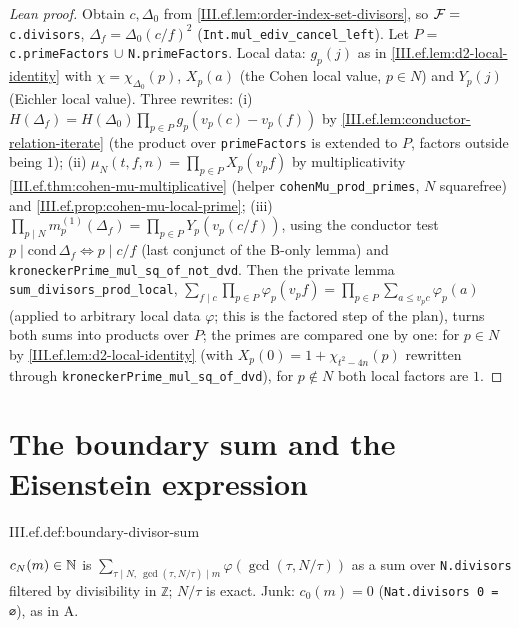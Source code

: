 \begin{proof}[Lean proof]
Obtain $c,\Delta_0$ from \cref{III.ef.lem:order-index-set-divisors}, so $\mathcal{F}=$ \texttt{c.divisors}, $\Delta_f=\Delta_0(c/f)^2$ (\texttt{Int.mul\_ediv\_cancel\_left}). Let $P=$ \texttt{c.primeFactors} $\cup$ \texttt{N.primeFactors}. Local data: $g_p(j)$ as in \cref{III.ef.lem:d2-local-identity} with $\chi=\chi_{\Delta_0}(p)$, $X_p(a)$ (the Cohen local value, $p\in N$) and $Y_p(j)$ (Eichler local value). Three rewrites: (i) $H(\Delta_f)=H(\Delta_0)\prod_{p\in P}g_p(v_p(c)-v_p(f))$ by \cref{III.ef.lem:conductor-relation-iterate} (the product over \texttt{primeFactors} is extended to $P$, factors outside being $1$); (ii) $\mu_N(t,f,n)=\prod_{p\in P}X_p(v_p f)$ by multiplicativity \cref{III.ef.thm:cohen-mu-multiplicative} (helper \texttt{cohenMu\_prod\_primes}, $N$ squarefree) and \cref{III.ef.prop:cohen-mu-local-prime}; (iii) $\prod_{p\mid N}m^{(1)}_p(\Delta_f)=\prod_{p\in P}Y_p(v_p(c/f))$, using the conductor test $p\mid\mathrm{cond}\,\Delta_f\iff p\mid c/f$ (last conjunct of the B-only lemma) and \texttt{kroneckerPrime\_mul\_sq\_of\_not\_dvd}. Then the private lemma \texttt{sum\_divisors\_prod\_local}, $\sum_{f\mid c}\prod_{p\in P}\varphi_p(v_p f)=\prod_{p\in P}\sum_{a\le v_p c}\varphi_p(a)$ (applied to arbitrary local data $\varphi$; this is the factored step of the plan), turns both sums into products over $P$; the primes are compared one by one: for $p\in N$ by \cref{III.ef.lem:d2-local-identity} (with $X_p(0)=1+\chi_{t^2-4n}(p)$ rewritten through \texttt{kroneckerPrime\_mul\_sq\_of\_dvd}), for $p\notin N$ both local factors are $1$.
\end{proof}

\section{The boundary sum and the Eisenstein expression}\label{sec:ef-boundary}

\begin{definition}
\end{definition}
\begin{tfformal}{III.ef.def:boundary-divisor-sum}
\begin{tffidelity}
$c_N(m)\in\mathbb{N}$ is $\sum_{\tau\mid N,\ \gcd(\tau,N/\tau)\mid m}\varphi(\gcd(\tau,N/\tau))$ as a sum over \texttt{N.divisors} filtered by divisibility in \texttt{ℤ}; $N/\tau$ is exact. Junk: $c_0(m)=0$ (\texttt{Nat.divisors 0 = ∅}), as in A.
\end{tffidelity}
\end{tfformal}

